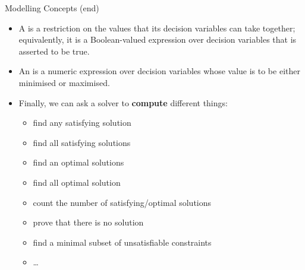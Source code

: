 \documentclass{cons-beamer}
\begin{document}
\begin{frame}{Modelling Concepts (end)}
  \begin{itemize}
    \item A  is a restriction on the values that its
    decision variables can take together; equivalently, it is a
    Boolean-valued expression over decision variables that is asserted to be true.
    \vfill
    
    \item An  is a numeric expression over decision variables whose value is to be either minimised or maximised.
    \vfill
    
    \item Finally, we can ask a solver to \textbf{compute} different things:
    \begin{itemize}
      \item find any satisfying solution
      \item find all satisfying solutions
      \item find an optimal solutions
      \item find all optimal solution
      \item count the number of satisfying/optimal solutions
      \item prove that there is no solution
      \item find a minimal subset of unsatisfiable constraints
      \item \dots
    \end{itemize}
  \end{itemize}
\end{frame}
\end{document}
